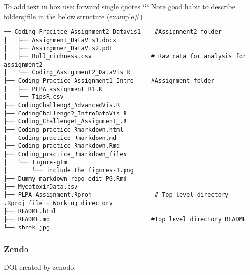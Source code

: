\documentclass[
]{article}
\begin{document}
To add text in box use: forward single quotes \textbf{```} Note good
habit to describe folders/file in the below structure (example\#)

\begin{verbatim}
── Coding Pracitce Assignment2_Datavis1    #Assignment2 folder
│   ├── Assignment_DataVis1.docx
│   ├── Assingmner_DataVis2.pdf
│   ├── Bull_richness.csv                 # Raw data for analysis for assignment2
│   └── Coding_Assignment2_DataVis.R
├── Coding Practice Assignment1_Intro     #Assignment folder
│   ├── PLPA_assignment_R1.R
│   └── TipsR.csv
├── CodingChalleng3_AdvancedVis.R
├── CodingChallenge2_IntroDataVis.R
├── Coding_Challenge1_Assignment_.R
├── Coding_practice_Rmarkdown.html
├── Coding_practice_Rmarkdown.md
├── Coding_practice_Rmarkdown.Rmd
├── Coding_practice_Rmarkdown_files
│   └── figure-gfm
│       └── include the figures-1.png
├── Dummy_markdown_repo_edit_PG.Rmd
├── MycotoxinData.csv
├── PLPA_Assignment.Rproj                  # Top level directory .Rproj file = Working directory
├── README.html
├── README.md                             #Top level directory README
└── shrek.jpg
\end{verbatim}

\subsubsection{\texorpdfstring{\textbf{Zendo}}{Zendo}}\label{zendo}

DOI created by zenodo:
\href{https://doi.org/10.5281/zenodo.14935003}{}
\end{document}
